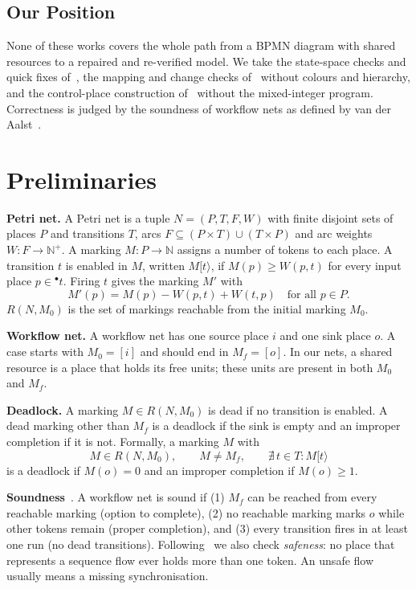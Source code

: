 \documentclass[conference]{IEEEtran}
\begin{document}
\subsection{Our Position}
None of these works covers the whole path from a BPMN diagram with shared resources to a repaired and
re-verified model. We take the state-space checks and quick fixes of~\cite{kraeuter}, the mapping and change
checks of~\cite{zhang} without colours and hierarchy, and the control-place construction of~\cite{wang}
without the mixed-integer program. Correctness is judged by the soundness of workflow nets as defined by
van der Aalst~\cite{aalst}.

\section{Preliminaries}

\textbf{Petri net.} A Petri net is a tuple $N=(P,T,F,W)$ with finite disjoint sets of places $P$ and
transitions $T$, arcs $F\subseteq(P\times T)\cup(T\times P)$ and arc weights $W:F\to\mathbb{N}^+$. A marking
$M:P\to\mathbb{N}$ assigns a number of tokens to each place. A transition $t$ is enabled in $M$, written
$M[t\rangle$, if $M(p)\ge W(p,t)$ for every input place $p\in{}^\bullet t$. Firing $t$ gives the marking $M'$
with
\begin{equation}
M'(p)=M(p)-W(p,t)+W(t,p)\quad\text{for all }p\in P.
\end{equation}
$R(N,M_0)$ is the set of markings reachable from the initial marking $M_0$.

\textbf{Workflow net.} A workflow net has one source place $i$ and one sink place $o$. A case starts with
$M_0=[i]$ and should end in $M_f=[o]$. In our nets, a shared resource is a place that holds its free units;
these units are present in both $M_0$ and $M_f$.

\textbf{Deadlock.} A marking $M\in R(N,M_0)$ is dead if no transition is enabled. A dead marking other than $M_f$
is a deadlock if the sink is empty and an improper completion if it is not. Formally, a marking $M$ with
\begin{equation}
M\in R(N,M_0),\qquad M\neq M_f,\qquad \nexists\, t\in T: M[t\rangle
\end{equation}
is a deadlock if $M(o)=0$ and an improper completion if $M(o)\ge 1$.

\textbf{Soundness}~\cite{aalst}. A workflow net is sound if (1) $M_f$ can be reached from every reachable
marking (option to complete), (2) no reachable marking marks $o$ while other tokens remain (proper completion),
and (3) every transition fires in at least one run (no dead transitions). Following~\cite{kraeuter} we also
check \emph{safeness}: no place that represents a sequence flow ever holds more than one token. An unsafe flow
usually means a missing synchronisation.
\end{document}
